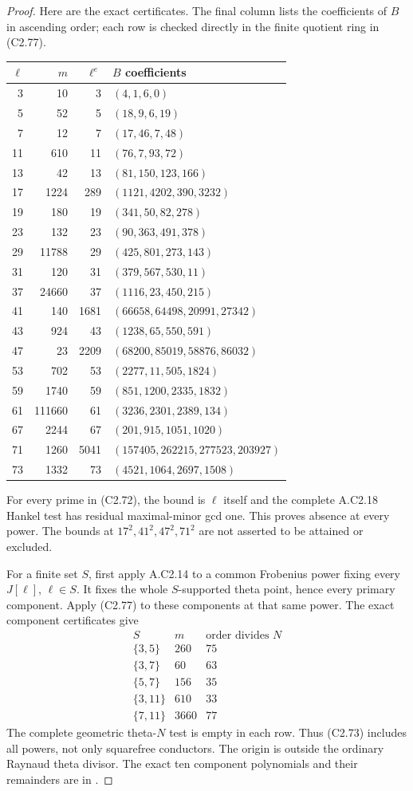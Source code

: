 \begin{proof}
Here are the exact certificates. The final
column lists the coefficients of $B$ in
ascending order; each row is checked directly
in the finite quotient ring in (C2.77).
\begin{center}
\scriptsize
\begin{tabular}{r r r l}
$\ell$&$m$&$\ell^e$&$B$ coefficients\\\hline
3&10&3&$(4,1,6,0)$\\
5&52&5&$(18,9,6,19)$\\
7&12&7&$(17,46,7,48)$\\
11&610&11&$(76,7,93,72)$\\
13&42&13&$(81,150,123,166)$\\
17&1224&289&$(1121,4202,390,3232)$\\
19&180&19&$(341,50,82,278)$\\
23&132&23&$(90,363,491,378)$\\
29&11788&29&$(425,801,273,143)$\\
31&120&31&$(379,567,530,11)$\\
37&24660&37&$(1116,23,450,215)$\\
41&140&1681&$(66658,64498,20991,27342)$\\
43&924&43&$(1238,65,550,591)$\\
47&23&2209&$(68200,85019,58876,86032)$\\
53&702&53&$(2277,11,505,1824)$\\
59&1740&59&$(851,1200,2335,1832)$\\
61&111660&61&$(3236,2301,2389,134)$\\
67&2244&67&$(201,915,1051,1020)$\\
71&1260&5041&$(157405,262215,277523,203927)$\\
73&1332&73&$(4521,1064,2697,1508)$
\end{tabular}
\end{center}
For every prime in (C2.72), the bound is
$\ell$ itself and the complete A.C2.18
Hankel test has residual maximal-minor gcd
one. This proves absence at every power.
The bounds at $17^2,41^2,47^2,71^2$ are
not asserted to be attained or excluded.

For a finite set $S$, first apply A.C2.14
to a common Frobenius power fixing every
$J[\ell]$, $\ell\in S$. It fixes the whole
$S$-supported theta point, hence every
primary component. Apply (C2.77) to these
components at that same power. The exact
component certificates give
\[
\begin{array}{c|r|r}
S&m&\text{order divides }N\\\hline
\{3,5\}&260&75\\
\{3,7\}&60&63\\
\{5,7\}&156&35\\
\{3,11\}&610&33\\
\{7,11\}&3660&77
\end{array}
\]
The complete geometric theta-$N$ test is
empty in each row. Thus (C2.73) includes
all powers, not only squarefree conductors.
The origin is outside the ordinary Raynaud
theta divisor. The exact ten component
polynomials and their remainders are in
.


\end{proof}
